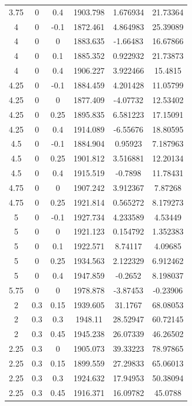 \begin{longtable}{|c|c|c|c|c|c|}
	3.75  & 0     & 0.4   & 1903.798 & 1.676934 & 21.73364 \\
	4     & 0     & -0.1  & 1872.461 & 4.864983 & 25.39089 \\
	4     & 0     & 0     & 1883.635 & -1.66483 & 16.67866 \\
	4     & 0     & 0.1   & 1885.352 & 0.922932 & 21.73873 \\
	4     & 0     & 0.4   & 1906.227 & 3.922466 & 15.4815 \\
	4.25  & 0     & -0.1  & 1884.459 & 4.201428 & 11.05799 \\
	4.25  & 0     & 0     & 1877.409 & -4.07732 & 12.53402 \\
	4.25  & 0     & 0.25  & 1895.835 & 6.581223 & 17.15091 \\
	4.25  & 0     & 0.4   & 1914.089 & -6.55676 & 18.80595 \\
	4.5   & 0     & -0.1  & 1884.904 & 0.95923 & 7.187963 \\
	4.5   & 0     & 0.25  & 1901.812 & 3.516881 & 12.20134 \\
	4.5   & 0     & 0.4   & 1915.519 & -0.7898 & 11.78431 \\
	4.75  & 0     & 0     & 1907.242 & 3.912367 & 7.87268 \\
	4.75  & 0     & 0.25  & 1921.814 & 0.565272 & 8.179273 \\
	5     & 0     & -0.1  & 1927.734 & 4.233589 & 4.53449 \\
	5     & 0     & 0     & 1921.123 & 0.154792 & 1.352383 \\
	5     & 0     & 0.1   & 1922.571 & 8.74117 & 4.09685 \\
	5     & 0     & 0.25  & 1934.563 & 2.122329 & 6.912462 \\
	5     & 0     & 0.4   & 1947.859 & -0.2652 & 8.198037 \\
	5.75  & 0     & 0     & 1978.878 & -3.87453 & -0.23906 \\
	2     & 0.3   & 0.15  & 1939.605 & 31.1767 & 68.08053 \\
	2     & 0.3   & 0.3   & 1948.11 & 28.52947 & 60.72145 \\
	2     & 0.3   & 0.45  & 1945.238 & 26.07339 & 46.26502 \\
	2.25  & 0.3   & 0     & 1905.073 & 39.33223 & 78.97865 \\
	2.25  & 0.3   & 0.15  & 1899.559 & 27.29833 & 65.06013 \\
	2.25  & 0.3   & 0.3   & 1924.632 & 17.94953 & 50.38094 \\
	2.25  & 0.3   & 0.45  & 1916.371 & 16.09782 & 45.0788 \\

\end{longtable}
